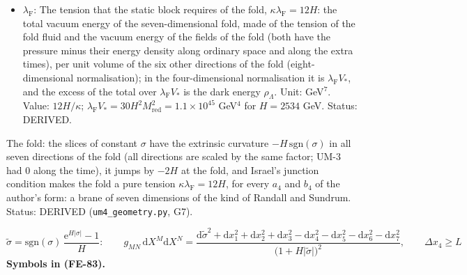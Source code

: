 \documentclass[
  10pt,
]{article}
\begin{document}
\begin{itemize}
  every \(a_4\), \(b_4\) of the author's form. Status: DERIVED.
\item
  \(\lambda_{\mathrm{F}}\): The tension that the static block requires
  of the fold, \(\kappa\lambda_{\mathrm{F}} = 12H\): the total vacuum
  energy of the seven-dimensional fold, made of the tension of the fold
  fluid and the vacuum energy of the fields of the fold (both have the
  pressure minus their energy density along ordinary space and along the
  extra times), per unit volume of the six other directions of the fold
  (eight-dimensional normalisation); in the four-dimensional
  normalisation it is \(\lambda_{\mathrm{F}}V_*\), and the excess of the
  total over \(\lambda_{\mathrm{F}}V_*\) is the dark energy
  \(\rho_\Lambda\). Unit: GeV\(^7\). Value: \(12H/\kappa\);
  \(\lambda_{\mathrm{F}}V_* = 30H^2M_{\mathrm{red}}^2 = 1.1\times10^{45}\)
  GeV\(^4\) for \(H = 2534\) GeV. Status: DERIVED.
\end{itemize}

The fold: the slices of constant \(\sigma\) have the extrinsic curvature
\(-H\,\mathrm{sgn}(\sigma)\) in all seven directions of the fold (all
directions are scaled by the same factor; UM-3 had 0 along the time), it
jumps by \(-2H\) at the fold, and Israel's junction condition makes the
fold a pure tension \(\kappa\lambda_{\mathrm{F}} = 12H\), for every
\(a_4\) and \(b_4\) of the author's form: a brane of seven dimensions of
the kind of Randall and Sundrum. Status: DERIVED
(\texttt{um4\_geometry.py}, G7).

\[
\tilde\sigma = \mathrm{sgn}(\sigma)\,\frac{\mathrm{e}^{H\lvert\sigma\rvert} - 1}{H}:\qquad
g_{MN}\,\mathrm{d}X^M\mathrm{d}X^N = \frac{\mathrm{d}\tilde\sigma^2 + \mathrm{d}x_1^2 + \mathrm{d}x_2^2 + \mathrm{d}x_3^2 - \mathrm{d}x_4^2
 - \mathrm{d}x_5^2 - \mathrm{d}x_6^2 - \mathrm{d}x_7^2}{\big(1 + H\lvert\tilde\sigma\rvert\big)^2},\qquad \Delta x_4 \ge L \tag{FE-83}
\] \textbf{Symbols in (FE-83).}
\end{document}
